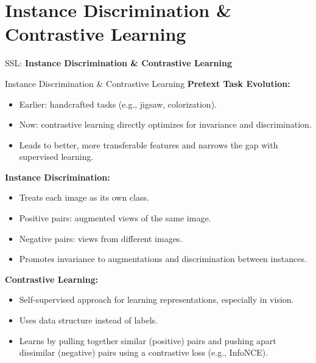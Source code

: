 \section{Instance Discrimination \& Contrastive Learning}
\begin{frame}{}
    \LARGE SSL: \textbf{Instance Discrimination \& Contrastive Learning}
\end{frame}

\begin{frame}[t,allowframebreaks]{Instance Discrimination \& Contrastive Learning }
    \textbf{Pretext Task Evolution:}
    \begin{itemize}
        \item Earlier: handcrafted tasks (e.g., jigsaw, colorization).
        \item Now: contrastive learning directly optimizes for invariance and discrimination.
        \item Leads to better, more transferable features and narrows the gap with supervised learning.
    \end{itemize}

    \framebreak

    \textbf{Instance Discrimination:}
    \begin{itemize}
        \item Treats each image as its own class.
        \item Positive pairs: augmented views of the same image.
        \item Negative pairs: views from different images.
        \item Promotes invariance to augmentations and discrimination between instances.
    \end{itemize}

    \vspace{0.5em}

    \textbf{Contrastive Learning:}
    \begin{itemize}
        \item Self-supervised approach for learning representations, especially in vision.
        \item Uses data structure instead of labels.
        \item Learns by pulling together similar (positive) pairs and pushing apart dissimilar (negative) pairs using a contrastive loss (e.g., InfoNCE).
    \end{itemize}
\end{frame}


